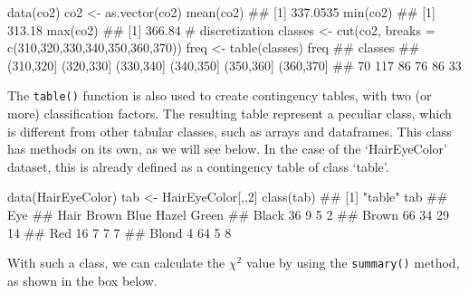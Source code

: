\documentclass[a4paper,12pt,oneside]{book}
\newenvironment{Shaded}{\begin{snugshade}}{\end{snugshade}}
\newcommand{\DecValTok}[1]{#1}
\newcommand{\CommentTok}[1]{#1}
\newcommand{\DocumentationTok}[1]{#1}
\newcommand{\OtherTok}[1]{#1}
\newcommand{\FunctionTok}[1]{#1}
\newcommand{\AttributeTok}[1]{#1}
\newcommand{\NormalTok}[1]{#1}
\begin{document}
\begin{Shaded}
\begin{Highlighting}[]
\FunctionTok{data}\NormalTok{(co2)}
\NormalTok{co2 }\OtherTok{\textless{}{-}} \FunctionTok{as.vector}\NormalTok{(co2)}
\FunctionTok{mean}\NormalTok{(co2)}
\DocumentationTok{\#\# [1] 337.0535}
\FunctionTok{min}\NormalTok{(co2)}
\DocumentationTok{\#\# [1] 313.18}
\FunctionTok{max}\NormalTok{(co2)}
\DocumentationTok{\#\# [1] 366.84}
\CommentTok{\# discretization}
\NormalTok{classes }\OtherTok{\textless{}{-}} \FunctionTok{cut}\NormalTok{(co2, }\AttributeTok{breaks =} \FunctionTok{c}\NormalTok{(}\DecValTok{310}\NormalTok{,}\DecValTok{320}\NormalTok{,}\DecValTok{330}\NormalTok{,}\DecValTok{340}\NormalTok{,}\DecValTok{350}\NormalTok{,}\DecValTok{360}\NormalTok{,}\DecValTok{370}\NormalTok{))}
\NormalTok{freq }\OtherTok{\textless{}{-}} \FunctionTok{table}\NormalTok{(classes)}
\NormalTok{freq}
\DocumentationTok{\#\# classes}
\DocumentationTok{\#\# (310,320] (320,330] (330,340] (340,350] (350,360] (360,370] }
\DocumentationTok{\#\#        70       117        86        76        86        33}
\end{Highlighting}
\end{Shaded}

The \texttt{table()} function is also used to create contingency tables, with two (or more) classification factors. The resulting table represent a peculiar class, which is different from other tabular classes, such as arrays and dataframes. This class has methods on its own, as we will see below. In the case of the `HairEyeColor' dataset, this is already defined as a contingency table of class `table'.

\begin{Shaded}
\begin{Highlighting}[]
\FunctionTok{data}\NormalTok{(HairEyeColor)}
\NormalTok{tab }\OtherTok{\textless{}{-}}\NormalTok{ HairEyeColor[,,}\DecValTok{2}\NormalTok{]}
\FunctionTok{class}\NormalTok{(tab)}
\DocumentationTok{\#\# [1] "table"}
\NormalTok{tab}
\DocumentationTok{\#\#        Eye}
\DocumentationTok{\#\# Hair    Brown Blue Hazel Green}
\DocumentationTok{\#\#   Black    36    9     5     2}
\DocumentationTok{\#\#   Brown    66   34    29    14}
\DocumentationTok{\#\#   Red      16    7     7     7}
\DocumentationTok{\#\#   Blond     4   64     5     8}
\end{Highlighting}
\end{Shaded}

With such a class, we can calculate the \(\chi^2\) value by using the \texttt{summary()} method, as shown in the box below.
\end{document}
